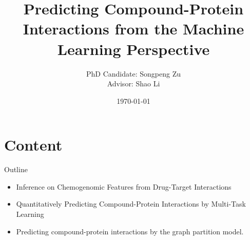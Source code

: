 \documentclass[mathserif,fleqn]{beamer}
\begin{document}
\title{Predicting Compound-Protein Interactions from the Machine Learning Perspective}
\author[zusp]{PhD Candidate: Songpeng Zu\\Advisor: Shao Li}
\date[\initclock\tdtime]{\today}
\frame[plain]{\titlepage}
\section*{Content}
\frame
{
    \begin{beamerboxesrounded}[upper=uppercol,shadow=true]{Outline}
    \begin{spacing}{1.2}
      \begin{itemize}
      \item
      Inference on Chemogenomic Features from Drug-Target Interactions
      \item
      Quantitatively Predicting Compound-Protein Interactions by Multi-Task Learning
      \item
      Predicting compound-protein interactions by the graph partition model.
      \end{itemize}
    \end{spacing}
    \end{beamerboxesrounded}
}
\end{document}
